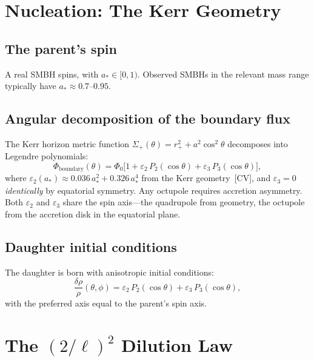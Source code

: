 \documentclass[11pt,a4paper]{article}
\theoremstyle{plain}
\theoremstyle{definition}
\theoremstyle{remark}
\begin{document}
\section{Nucleation: The Kerr Geometry}\label{sec:kerr}

\subsection{The parent's spin}\label{sec:spin}

A real SMBH spins, with $a_* \in [0,1)$.  Observed SMBHs in the relevant mass
range typically have $a_* \approx 0.7$--$0.95$.

\subsection{Angular decomposition of the boundary flux}\label{sec:angular}

The Kerr horizon metric function $\Sigma_+({\theta}) = r_+^2 + a^2\cos^2\theta$
decomposes into Legendre polynomials:
\begin{equation}
\Phi_{\mathrm{boundary}}(\theta) = \Phi_0\bigl[1 + \varepsilon_2\,P_2(\cos\theta)
+ \varepsilon_3\,P_3(\cos\theta)\bigr],
\label{eq:boundary}
\end{equation}
where $\varepsilon_2(a_*) \approx 0.036\,a_*^2 + 0.326\,a_*^4$ from the Kerr
geometry~[CV], and $\varepsilon_3 = 0$ \emph{identically} by equatorial symmetry.
Any octupole requires accretion asymmetry.  Both $\varepsilon_2$ and
$\varepsilon_3$ share the spin axis---the quadrupole from geometry, the octupole
from the accretion disk in the equatorial plane.

\subsection{Daughter initial conditions}\label{sec:daughter}

The daughter is born with anisotropic initial conditions:
\begin{equation}
\frac{\delta\rho}{\rho}(\theta,\phi) = \varepsilon_2\,P_2(\cos\theta)
+ \varepsilon_3\,P_3(\cos\theta),
\label{eq:ic}
\end{equation}
with the preferred axis equal to the parent's spin axis.

\section{The $(2/\ell)^2$ Dilution Law}\label{sec:dilution}
\end{document}
